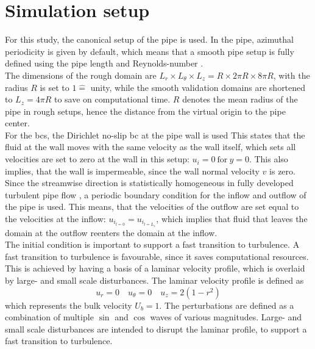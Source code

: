 \section{Simulation setup}\label{sec: Simulation setup}
For this study, the canonical setup of the pipe is used.
In the pipe, azimuthal periodicity is given by default, which means that a smooth pipe setup is fully defined using the pipe length and Reynolds-number \citep{yaoDirectNumericalSimulations2023}.\\
The dimensions of the rough domain are $L_r \times L_\theta \times L_z = R \times 2\pi R \times 8\pi R$, with the radius $R$ is set to $1 \hat{=}$ unity, while the smooth validation domains are shortened to $L_z = 4\pi R$ to save on computational time.
$R$ denotes the mean radius of the pipe in rough setups, hence the distance from the virtual origin to the pipe center.\\
For the \acrfull{bcs}, the Dirichlet no-slip \acrshort{bc} at the pipe wall is used
This states that the fluid at the wall  moves with the same velocity as the wall itself, which sets all velocities are set to zero at the wall in this setup: $u_i = 0 \ \text{for}\ y = 0$.
This also implies, that the wall is impermeable, since the wall normal velocity $v$ is zero.
Since the streamwise direction is statistically homogeneous in fully developed turbulent pipe flow \citep{moinDIRECTNUMERICALSIMULATION1998}, a periodic boundary condition for the inflow and outflow of the pipe is used.
This means, that the velocities of the outflow are set equal to the velocities at the inflow: $u_{i_{l = 0}} = u_{i_{l=L_z}}$, which implies that fluid that leaves the domain at the outflow reenters the domain at the inflow.\\
The initial condition is important to support a fast transition to turbulence.
A fast transition to turbulence is favourable, since it saves computational resources.
This is achieved by having a basis of a laminar velocity profile, which is overlaid by large- and small scale disturbances.
The laminar velocity profile is defined as
\begin{equation}\label{eq: laminar velocity profile}
    u_r = 0 \quad u_\theta = 0 \quad u_z = 2(1-r^2)
\end{equation}
which represents the bulk velocity $U_b = 1$.
The perturbations are defined as a combination of multiple $\sin$ and $\cos$ waves of various magnitudes.
Large- and small scale disturbances are intended to disrupt the laminar profile, to support a fast transition to turbulence.
